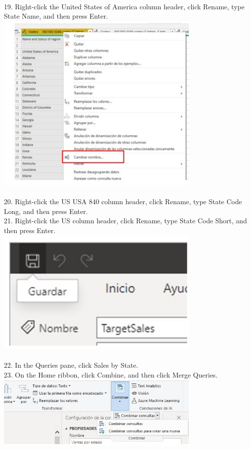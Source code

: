 \documentclass[preprint,12pt]{elsarticle}
\begin{document}
\begin{itemize}
		 		\\ 19. Right-click the United States of America column header, click Rename, type State Name, and then press
		 		Enter.
		 		\\ \includegraphics[width=10cm]{./IMAGENES/3.19} \\
		 		\\ 20. Right-click the US USA 840 column header, click Rename, type State Code Long, and then press Enter.
		 		\\ 21. Right-click the US column header, click Rename, type State Code Short, and then press Enter.
		 		\\ \includegraphics[width=10cm]{./IMAGENES/2.30} \\
		 		\\ 22. In the Queries pane, click Sales by State.
		 		\\ 23. On the Home ribbon, click Combine, and then click Merge Queries.
		 		\\ \includegraphics[width=10cm]{./IMAGENES/3.23} \\

\end{itemize}
\end{document}
